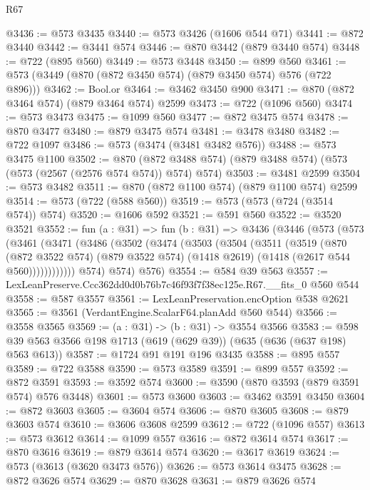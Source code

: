 \begin{lexlean}{R67}
\begin{coremodule}
@3436 := @573 @3435
@3440 := @573 @3426 (@1606 @544 @71)
@3441 := @872 @3440
@3442 := @3441 @574
@3446 := @870 @3442 (@879 @3440 @574)
@3448 := @722 (@895 @560)
@3449 := @573 @3448
@3450 := @899 @560
@3461 := @573 (@3449 (@870 (@872 @3450 @574) (@879 @3450 @574) @576 (@722 @896)))
@3462 := Bool.or
@3464 := @3462 @3450 @900
@3471 := @870 (@872 @3464 @574) (@879 @3464 @574) @2599
@3473 := @722 (@1096 @560)
@3474 := @573 @3473
@3475 := @1099 @560
@3477 := @872 @3475 @574
@3478 := @870 @3477
@3480 := @879 @3475 @574
@3481 := @3478 @3480
@3482 := @722 @1097
@3486 := @573 (@3474 (@3481 @3482 @576))
@3488 := @573 @3475 @1100
@3502 := @870 (@872 @3488 @574) (@879 @3488 @574) (@573 (@573 (@2567 (@2576 @574 @574)) @574) @574)
@3503 := @3481 @2599
@3504 := @573 @3482
@3511 := @870 (@872 @1100 @574) (@879 @1100 @574) @2599
@3514 := @573 (@722 (@588 @560))
@3519 := @573 (@573 (@724 (@3514 @574)) @574)
@3520 := @1606 @592
@3521 := @591 @560
@3522 := @3520 @3521
@3552 := fun (a : @31) =>
  fun (b : @31) =>
  @3436
    (@3446
      (@573
        (@573
          (@3461
            (@3471
              (@3486
                (@3502
                  (@3474
                    (@3503
                      (@3504
                        (@3511
                          (@3519
                            (@870
                              (@872 @3522 @574)
                              (@879 @3522 @574)
                              (@1418 @2619)
                              (@1418 (@2617 @544 @560))))))))))))
          @574)
        @574)
      @576)
@3554 := @584 @39 @563
@3557 := LexLeanPreserve.Ccc362dd0d0b76b7c46f93f7f38ec125e.R67.__fits_0 @560 @544
@3558 := @587 @3557
@3561 := LexLeanPreservation.encOption @538 @2621
@3565 := @3561 (VerdantEngine.ScalarF64.planAdd @560 @544)
@3566 := @3558 @3565
@3569 := (a : @31) -> (b : @31) -> @3554 @3566
@3583 := @598 @39 @563 @3566 @198 @1713 (@619 (@629 @39)) (@635 (@636 (@637 @198) @563 @613))
@3587 := @1724 @91 @191 @196 @3435
@3588 := @895 @557
@3589 := @722 @3588
@3590 := @573 @3589
@3591 := @899 @557
@3592 := @872 @3591
@3593 := @3592 @574
@3600 := @3590 (@870 @3593 (@879 @3591 @574) @576 @3448)
@3601 := @573 @3600
@3603 := @3462 @3591 @3450
@3604 := @872 @3603
@3605 := @3604 @574
@3606 := @870 @3605
@3608 := @879 @3603 @574
@3610 := @3606 @3608 @2599
@3612 := @722 (@1096 @557)
@3613 := @573 @3612
@3614 := @1099 @557
@3616 := @872 @3614 @574
@3617 := @870 @3616
@3619 := @879 @3614 @574
@3620 := @3617 @3619
@3624 := @573 (@3613 (@3620 @3473 @576))
@3626 := @573 @3614 @3475
@3628 := @872 @3626 @574
@3629 := @870 @3628
@3631 := @879 @3626 @574

\end{coremodule}
\end{lexlean}
